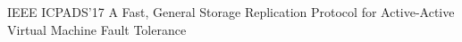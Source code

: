 \cvpub
{IEEE ICPADS'17} %
{A Fast, General Storage Replication Protocol for Active-Active Virtual Machine Fault  Tolerance} %
{} %
{} %
{ %
}
